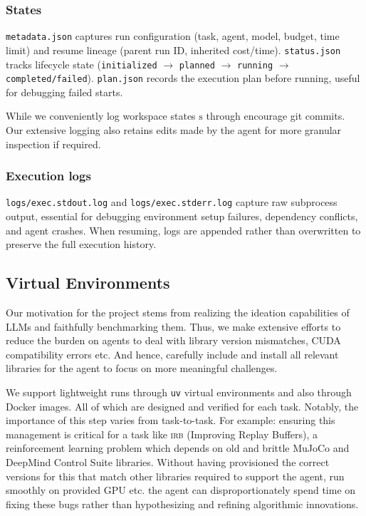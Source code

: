 \documentclass[11pt]{article}
\let\oldtexttt\texttt
\renewcommand{\texttt}[1]{{\fontseries{m}\selectfont\oldtexttt{#1}}}
\newcommand{\kw}[1]{{\textsc{\MakeLowercase{#1}}}}
\theoremstyle{plain}
\theoremstyle{definition}
\theoremstyle{remark}
\begin{document}
\subsubsection{States}
\texttt{metadata.json} captures run configuration (task, agent, model, budget, time limit) and resume lineage (parent run ID, inherited cost/time). \texttt{status.json} tracks lifecycle state (\texttt{initialized} $\to$ \texttt{planned} $\to$ \texttt{running} $\to$ \texttt{completed/failed}). \texttt{plan.json} records the execution plan before running, useful for debugging failed starts.

While we conveniently log workspace states $\text{s}$ through encourage git commits. Our extensive logging also retains edits made by the agent for more granular inspection if required. 

\subsubsection{Execution logs} \texttt{logs/exec.stdout.log} and \texttt{logs/exec.stderr.log} capture raw subprocess output, essential for debugging environment setup failures, dependency conflicts, and agent crashes. When resuming, logs are appended rather than overwritten to preserve the full execution history.

\subsection{Virtual Environments} \label{app:venv}

Our motivation for the project stems from realizing the ideation capabilities of LLMs and faithfully benchmarking them. Thus, we make extensive efforts to reduce the burden on agents to deal with library version mismatches, CUDA compatibility errors etc. And hence, carefully include and install all relevant libraries for the agent to focus on more meaningful challenges.

We support lightweight runs through \texttt{uv} virtual environments and also through Docker images. All of which are designed and verified for each task. Notably, the importance of this step varies from task-to-task. For example: ensuring this management is critical for a task like \kw{irb} (Improving Replay Buffers), a reinforcement learning problem which depends on old and brittle MuJoCo and DeepMind Control Suite libraries. Without having provisioned the correct versions for this that match other libraries required to support the agent, run smoothly on provided GPU etc. the agent can disproportionately spend time on fixing these bugs rather than hypothesizing and refining algorithmic innovations. 
\end{document}
